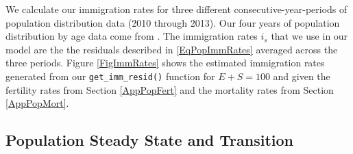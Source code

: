 \documentclass[letterpaper,12pt]{article}
\theoremstyle{definition}
\begin{document}
    We calculate our immigration rates for three different consecutive-year-periods of population distribution data (2010 through 2013). Our four years of population distribution by age data come from \citet{Census:2015}. The immigration rates $i_s$ that we use in our model are the the residuals described in \eqref{EqPopImmRates} averaged across the three periods. Figure \ref{FigImmRates} shows the estimated immigration rates generated from our \texttt{get\_imm\_resid()} function for $E+S=100$ and given the fertility rates from Section \ref{AppPopFert} and the mortality rates from Section \ref{AppPopMort}.


  \subsection{Population Steady State and Transition}\label{AppPopSStrans}
\end{document}
